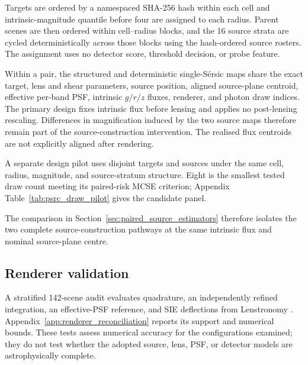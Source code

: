 Targets are ordered by a namespaced SHA-256 hash within each cell and
intrinsic-magnitude quantile before four are assigned to each radius. Parent
scenes are then ordered within cell--radius blocks, and the 16 source strata
are cycled deterministically across those blocks using the hash-ordered source
rosters. The assignment uses no detector score, threshold decision, or probe
feature.

Within a pair, the structured and deterministic single-S\'{e}rsic maps share
the exact target, lens and shear parameters, source position,
aligned source-plane centroid, effective per-band PSF, intrinsic \(g/r/z\) fluxes,
renderer, and photon draw indices. The primary design fixes intrinsic flux
before lensing and applies no post-lensing rescaling. Differences in
magnification induced by the two source maps therefore remain part of the
source-construction intervention. The realised flux centroids are not explicitly aligned
after rendering.

A separate design pilot uses disjoint targets and sources under the same
cell, radius, magnitude, and source-stratum structure. Eight is the smallest
tested draw count meeting its paired-risk MCSE criterion; Appendix
Table~\ref{tab:psrc_draw_pilot} gives the candidate panel.

The comparison in Section~\ref{sec:paired_source_estimators} therefore
isolates the two complete source-construction pathways at the same intrinsic
flux and nominal source-plane centre.

\subsection{Renderer validation}
\label{sec:renderer_validation}

A stratified 142-scene audit evaluates quadrature, an independently refined
integration, an effective-PSF reference, and SIE deflections from Lenstronomy
\citep{Birrer2018}. Appendix~\ref{app:renderer_reconciliation} reports its
support and numerical bounds. These tests assess numerical accuracy for the
configurations examined; they do not test whether the adopted source, lens,
PSF, or detector models are astrophysically complete.
